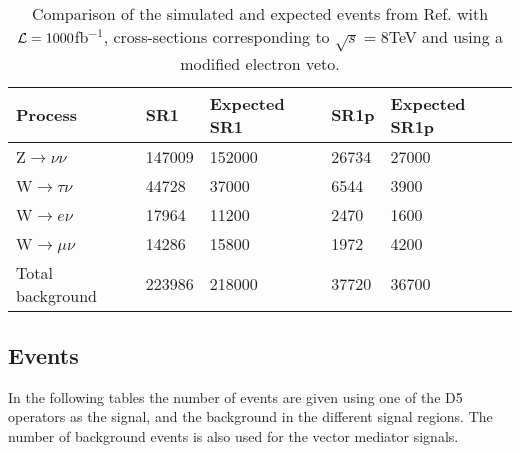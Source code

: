 \begin{table}[ht]
\begin{center}
\begin{tabular}{|l|l|l|l|l|}
\hline
Process & SR1  & Expected SR1 & SR1p & Expected SR1p  \\ \hline
Z$\rightarrow\nu\nu$ & 147009 & 152000 & 26734 & 27000 \\
W$\rightarrow\tau\nu$ & 44728 & 37000 & 6544 & 3900 \\
W$\rightarrow e\nu$ & 17964 & 11200 & 2470 & 1600 \\
W$\rightarrow\mu\nu$ & 14286 & 15800 & 1972 & 4200 \\ \hline
Total background & 223986 & 218000 & 37720 & 36700 \\ \hline
\end{tabular}
\caption{Comparison of the simulated and expected events from Ref. \citep{ATLAS-CONF-2012-147} with $\mathcal{L}=1000$fb$^{-1}$, cross-sections corresponding to $\sqrt{s}=8$TeV and using a modified electron veto.}
\label{tab:newcomp}
\end{center}
\end{table}


\subsection{Events}
In the following tables the number of events are given using one of the D5 operators as the signal, and the background in the different signal regions. The number of background events is also used for the vector mediator signals.

